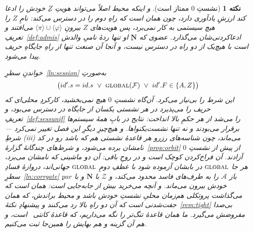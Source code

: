 \documentclass[10pt,oneside,openany]{book}
\newcommand{\admits}{\mathbf{N}}
\newcommand{\pars}{\mathit{par}}
\newcommand{\F}{\mathcal{F}}
\newcommand{\Zenv}{\mathcal{Z}}
\newcommand{\Adv}{\mathcal{A}}
\newcommand{\op}[1]{\textnormal{\textsc{#1}}}
\newcommand{\id}{id}
\newcommand{\ncl}[1]{\langle #1 \rangle}
\theoremstyle{accentdef}
\newtheorem{remark}[definition]{نکته}
\theoremstyle{accentplain}
\begin{document}
\begin{remark}[نشستِ $0$ ممتاز است]
و اینکه محیط اصلاً می‌تواند هویتِ $Z$ِ خودش را ادعا کند ارزشِ یادآوری دارد،
چون همان است که راهِ دوم را در دسترس می‌کند: نامِ $Z$ را هیچ سیستمی به کار
نمی‌برد، پس هویت‌های $Z$ بیرونِ $\ncl{\pi} \cup \ncl{\varphi}$ می‌افتند و
تعریفِ~\ref{def:admis} ادعاکردنی‌شان می‌گذارد. عضوی که $\admits$ِ او تنها
ردهٔ نامیِ والدش است با هیچ‌یک از دو راه در دسترس نیست، و آنجا آن صنعت تنها
از راهِ جایگاهِ حریف پیدا می‌شود.

خواندنِ سطرِ~\ref{ln:session} به‌صورتِ
\[
  \bigl(\id'.s = \id.s \ \vee\ \op{global}(\F) \ \vee\ \id'.F \in \{A,Z\}\bigr)
\]
این شرط را بی‌نیاز می‌کرد. آن‌گاه نشستِ $0$ هیچ نمی‌بخشید، کارکردِ محلی‌ای
که حریف را می‌پذیرد در هر نشستی یکسان از جایگاه در دسترس می‌بود، و
تعریفِ~\ref{def:sessunif} را می‌شد از هر حکمِ بالا انداخت: نتایج در بابِ
همهٔ سیستم‌ها برقرار می‌بودند و نه تنها نشست‌یکنواها. و هیچ‌چیزِ دیگرِ این
فصل تغییر نمی‌کرد --- شرطِ (iii) می‌ماند، چون شناسه‌های رزرو هر قاعدهٔ نشستی
هم که باشد رو در کد نامشان برده می‌شود، و شرط‌های چندگانهٔ
گزارهٔ~\ref{prop:orbit} از پیش از نشستِ $0$ آزادند. آن فراخ‌کردن کوچک است
و در روحِ باقی: آن دو ماشینی که نامشان می‌برد، هر جا $\op{global}$ در بابشان
آزموده شود با عطفِ دومِ $\op{global}$ جهانی‌اند، دروازهٔ فسادِ
سطرِ~\ref{ln:corrgate} باز $\Adv$ را به طرف‌های فاسد محدود می‌کند، و
$\Zenv$ با $\admits$ و با $\pars$ِ خودش بیرون می‌ماند. و آنچه می‌خرید بیش
از جابه‌جایی است: همان است که می‌گذاشت پروتکلی هم‌زمان محلیِ نشستِ خودش باشد
و محیط براندش، که همان جفت‌شدنی است که آن دو راهِ بالا رد می‌کنند و
پیشنهادِ نکتهٔ~\ref{rem:tight} بی‌صدا مفروضش می‌گیرد. ما همان قاعدهٔ
تنگ‌تر را نگه می‌داریم، که قاعدهٔ کانتی~\cite{Canetti20} است، و هم آن
گزینه و هم بهایش را همین‌جا ثبت می‌کنیم.
\end{remark}
\end{document}
